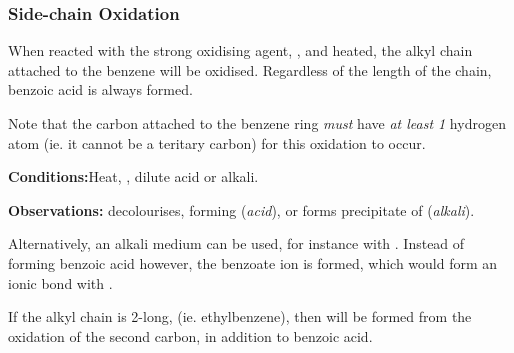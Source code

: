 			\subsubsection{Side-chain Oxidation}

				When reacted with the strong oxidising agent, , and heated, the alkyl chain attached to the benzene will be oxidised.
				Regardless of the length of the chain, benzoic acid is always formed.

				Note that the carbon attached to the benzene ring \textit{must} have \textit{at least 1} hydrogen atom (ie. it cannot be a
				teritary carbon) for this oxidation to occur.

				\vspace{1.5em}

				\vbox{\textbf{Conditions:}\tabto{35mm}Heat, , dilute acid or alkali.}

				\vspace{0.75em}
				\vbox{\textbf{Observations:}\tabto{35mm}  decolourises, forming  (\textit{acid}), or
											\tabto{35mm}forms  precipitate of  (\textit{alkali}).}



				\pagebreak
				Alternatively, an alkali medium can be used, for instance with . Instead of forming benzoic acid however, the
				benzoate ion is formed, which would form an ionic bond with .





				If the alkyl chain is 2-long, (ie. ethylbenzene), then  will be formed from the oxidation of the second carbon,
				in addition to benzoic acid.


